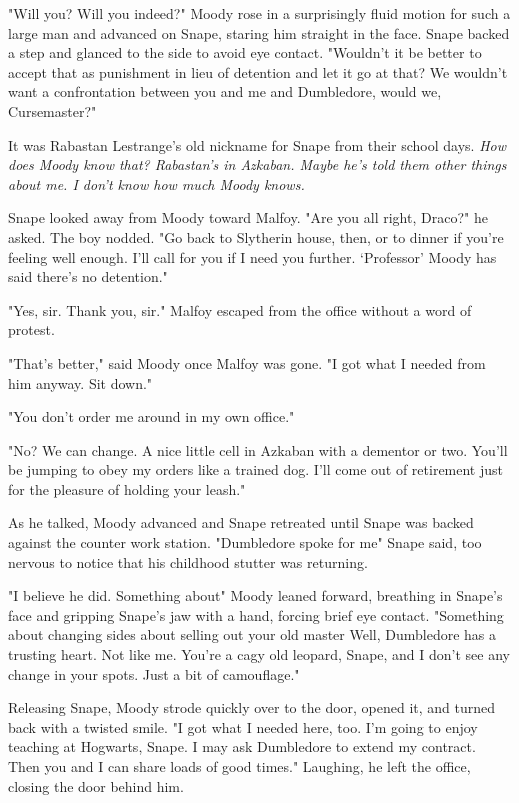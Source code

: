 "Will you? Will you indeed?" Moody rose in a surprisingly fluid motion for such a large man and advanced on Snape, staring him straight in the face. Snape backed a step and glanced to the side to avoid eye contact. "Wouldn't it be better to accept that as punishment in lieu of detention and let it go at that? We wouldn't want a confrontation between you and me and Dumbledore, would we, Cursemaster?"

It was Rabastan Lestrange's old nickname for Snape from their school days. \emph{How does Moody know that? Rabastan's in Azkaban. Maybe he's told them other things about me. I don't know how much Moody knows.}

Snape looked away from Moody toward Malfoy. "Are you all right, Draco?" he asked. The boy nodded. "Go back to Slytherin house, then, or to dinner if you're feeling well enough. I'll call for you if I need you further. `Professor' Moody has said there's no detention."

"Yes, sir. Thank you, sir." Malfoy escaped from the office without a word of protest.

"That's better," said Moody once Malfoy was gone. "I got what I needed from him anyway. Sit down."

"You don't order me around in my own office."

"No? We can change. A nice little cell in Azkaban with a dementor or two. You'll be jumping to obey my orders like a trained dog. I'll come out of retirement just for the pleasure of holding your leash."

As he talked, Moody advanced and Snape retreated until Snape was backed against the counter work station. "Dumbledore{\el} spoke for me{\el}" Snape said, too nervous to notice that his childhood stutter was returning.

"I believe he did. Something about{\el}" Moody leaned forward, breathing in Snape's face and gripping Snape's jaw with a hand, forcing brief eye contact. "Something about changing sides{\el} about selling out your old master{\el} Well, Dumbledore has a trusting heart. Not like me. You're a cagy old leopard, Snape, and I don't see any change in your spots. Just a bit of camouflage."

Releasing Snape, Moody strode quickly over to the door, opened it, and turned back with a twisted smile. "I got what I needed here, too. I'm going to enjoy teaching at Hogwarts, Snape. I may ask Dumbledore to extend my contract. Then you and I can share loads of good times." Laughing, he left the office, closing the door behind him.

